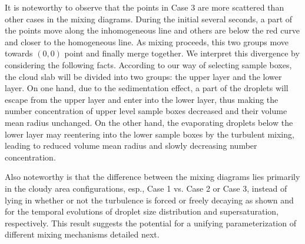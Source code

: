\documentclass[draft,jgrga]{AGUTeX}
\begin{document}
\begin{article}
It is noteworthy to observe that the points in Case 3 are more scattered than other cases in the mixing diagrams. During the initial several seconds, a part of the points move along the inhomogeneous line and others are below the red curve and closer to the homogeneous line. As mixing proceeds, this two groups move towards $(0,0)$ point and finally merge together. We interpret this divergence by considering the following facts. According to our way of selecting sample boxes, the cloud slab will be divided into two groups: the upper layer and the lower layer. On one hand, due to the sedimentation effect, a part of the droplets will escape from the upper layer and enter into the lower layer, thus making the number concentration of upper level sample boxes decreased and their volume mean radius unchanged. On the other hand, the evaporating droplets below the lower layer may reentering into the lower sample boxes by the turbulent mixing, leading to reduced volume mean radius and slowly decreasing number concentration. 

Also noteworthy is that the difference between the mixing diagrams lies primarily in the cloudy area configurations, esp., Case 1 vs. Case 2 or Case 3, instead of lying in whether or not the turbulence is forced or freely decaying as shown  and  for the temporal evolutions of droplet size distribution and supersaturation, respectively.  This result suggests the potential for a unifying parameterization of different mixing mechanisms detailed next.


\end{article}
\end{document}
